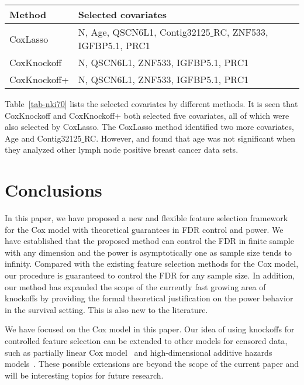 \documentclass[11pt]{article}
\begin{document}
\begin{table*}[h!]
	\centering
	\caption{Feature selection results for the Breast cancer data.}
	\begin{tabular}{l l} 
		\toprule
		\textbf{Method} & \textbf{Selected covariates} \\ 
		\hline
		CoxLasso     & N, Age, QSCN6L1, Contig32125$\_$RC, ZNF533, IGFBP5.1, PRC1\\
		CoxKnockoff  & N, QSCN6L1, ZNF533, IGFBP5.1, PRC1\\
		CoxKnockoff+ & N, QSCN6L1, ZNF533, IGFBP5.1, PRC1\\
		\bottomrule
	\end{tabular}\label{tab-nki70}
\end{table*}


Table~\ref{tab-nki70} lists the selected covariates by different methods. It is seen that CoxKnockoff and CoxKnockoff+ both selected five covariates,  all of which were also selected by CoxLasso. The CoxLasso method identified two more covariates, Age and Contig32125$\_$RC.
However, \cite{mook200970} and \cite{liu2012variable} found that age was not significant when they analyzed other lymph node positive breast cancer data sets. 





\section{Conclusions}\label{sec: Discussion}


In this paper, we have proposed a new and flexible feature selection framework for the Cox model with theoretical guarantees in FDR control and power. We have established that the proposed method can control the FDR in finite sample with any dimension and the power is asymptotically one as sample size tends to infinity.  Compared with the existing feature selection methods for the Cox model, our procedure is guaranteed to control the FDR for any sample size. In addition, our method has expanded the scope of the currently fast growing area of knockoffs by providing the formal theoretical justification on the power behavior in the survival setting. This is also new to the literature.

We have focused on the Cox model in this paper. Our idea of using  
knockoffs for controlled feature selection can be extended to other models for censored data, such as
partially linear Cox model~\citep{wu2020variable}  
and high-dimensional additive hazards models~\citep{lin2013high, zheng2022L0}.
These possible extensions are beyond the scope of the current paper and will be interesting topics for future research.
\end{document}
